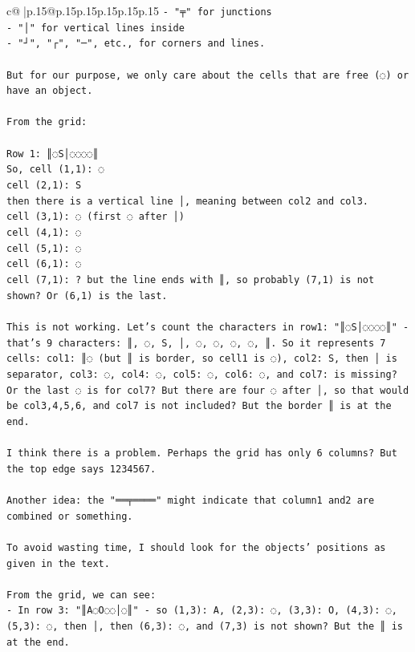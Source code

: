 \documentclass{article}
\begin{document}
{\begin{supertabular}{c@{$\;$}|p{.15\linewidth}@{}p{.15\linewidth}p{.15\linewidth}p{.15\linewidth}p{.15\linewidth}p{.15\linewidth}}
{{{\texttt{{-} "╤" for junctions} \\
\texttt{{-} "│" for vertical lines inside} \\
\texttt{{-} "┘", "┌", "─", etc., for corners and lines.} \\
\\ 
\texttt{But for our purpose, we only care about the cells that are free (◌) or have an object.} \\
\\ 
\texttt{From the grid:} \\
\\ 
\texttt{Row 1: ║◌S│◌◌◌◌║} \\
\texttt{So, cell (1,1): ◌} \\
\texttt{cell (2,1): S} \\
\texttt{then there is a vertical line │, meaning between col2 and col3.} \\
\texttt{cell (3,1): ◌ (first ◌ after │)} \\
\texttt{cell (4,1): ◌} \\
\texttt{cell (5,1): ◌} \\
\texttt{cell (6,1): ◌} \\
\texttt{cell (7,1): ? but the line ends with ║, so probably (7,1) is not shown? Or (6,1) is the last.} \\
\\ 
\texttt{This is not working. Let's count the characters in row1: "║◌S│◌◌◌◌║" {-} that's 9 characters: ║, ◌, S, │, ◌, ◌, ◌, ◌, ║. So it represents 7 cells: col1: ║◌ (but ║ is border, so cell1 is ◌), col2: S, then │ is separator, col3: ◌, col4: ◌, col5: ◌, col6: ◌, and col7: is missing? Or the last ◌ is for col7? But there are four ◌ after │, so that would be col3,4,5,6, and col7 is not included? But the border ║ is at the end.} \\
\\ 
\texttt{I think there is a problem. Perhaps the grid has only 6 columns? But the top edge says 1234567.} \\
\\ 
\texttt{Another idea: the "══╤════" might indicate that column1 and2 are combined or something.} \\
\\ 
\texttt{To avoid wasting time, I should look for the objects' positions as given in the text.} \\
\\ 
\texttt{From the grid, we can see:} \\
\texttt{{-} In row 3: "║A◌O◌◌│◌║" {-} so (1,3): A, (2,3): ◌, (3,3): O, (4,3): ◌, (5,3): ◌, then │, then (6,3): ◌, and (7,3) is not shown? But the ║ is at the end.} \\
}}}
\end{supertabular}}
\end{document}
